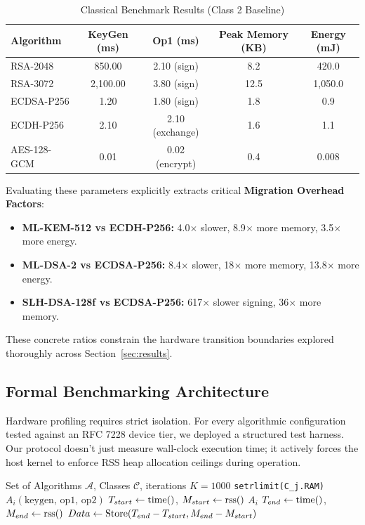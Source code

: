 \begin{table}[htbp]
\caption{Classical Benchmark Results (Class 2 Baseline)}
\label{tab:classical_bench}
\centering
\begin{tabular}{lcccc}
\toprule
\textbf{Algorithm} & \textbf{KeyGen (ms)} & \textbf{Op1 (ms)} & \textbf{Peak Memory (KB)} & \textbf{Energy (mJ)} \\
\midrule
RSA-2048 & 850.00 & 2.10 (sign) & 8.2 & 420.0 \\
RSA-3072 & 2,100.00 & 3.80 (sign) & 12.5 & 1,050.0 \\
ECDSA-P256 & 1.20 & 1.80 (sign) & 1.8 & 0.9 \\
ECDH-P256 & 2.10 & 2.10 (exchange) & 1.6 & 1.1 \\
AES-128-GCM & 0.01 & 0.02 (encrypt) & 0.4 & 0.008 \\
\bottomrule
\end{tabular}
\end{table}

Evaluating these parameters explicitly extracts critical \textbf{Migration Overhead Factors}:
\begin{itemize}
 \item \textbf{ML-KEM-512 vs ECDH-P256:} 4.0$\times$ slower, 8.9$\times$ more memory, 3.5$\times$ more energy.
 \item \textbf{ML-DSA-2 vs ECDSA-P256:} 8.4$\times$ slower, 18$\times$ more memory, 13.8$\times$ more energy.
 \item \textbf{SLH-DSA-128f vs ECDSA-P256:} 617$\times$ slower signing, 36$\times$ more memory.
\end{itemize}
These concrete ratios constrain the hardware transition boundaries explored thoroughly across Section~\ref{sec:results}.

\subsection{Formal Benchmarking Architecture}

Hardware profiling requires strict isolation. For every algorithmic configuration tested against an RFC 7228 device tier, we deployed a structured test harness. Our protocol doesn't just measure wall-clock execution time; it actively forces the host kernel to enforce RSS heap allocation ceilings during operation. 

\begin{algorithm}
\caption{Core Benchmarking Protocol Lifecycle}\label{alg:bench}
\begin{algorithmic}[1]
\Require Set of Algorithms $\mathcal{A}$, Classes $\mathcal{C}$, iterations $K=1000$
 \State {} \texttt{setrlimit(C\_j.RAM)}
  
 \State {} $A_i(\text{keygen, op1, op2})$
 \EndFor
  
 \State $T_{start} \gets \text{time()}$, $M_{start} \gets \text{rss()}$
 \State {} $A_i$
 \State $T_{end} \gets \text{time()}$, $M_{end} \gets \text{rss()}$
 \State $Data \gets \text{Store}(T_{end}-T_{start}, M_{end}-M_{start})$
 \EndFor
 \EndFor
\EndFor
\end{algorithmic}
\end{algorithm}

